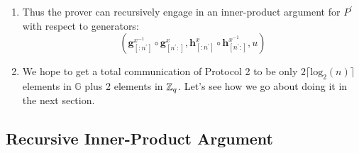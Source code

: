 \begin{enumerate}
    \item Thus the prover can recursively engage in an inner-product argument for $P^{\prime}$ with respect to generators:
    \begin{equation*}
        (\textbf{g}^{x^{-1}}_{[:n^{\prime}]} \circ \textbf{g}^x_{[n^{\prime}:]}, \textbf{h}^x_{[:n^{\prime}]} \circ \textbf{h}^{x^{-1}}_{[n^{\prime}:]},u)
    \end{equation*}

    \item We hope to get a total communication of Protocol 2 to be only $2\lceil \text{log}_2 (n) \rceil$ elements in $\mathbb{G}$ plus 2 elements in $\mathbb{Z}_q$. Let's see how we go about doing it in the next section.
    
\end{enumerate}

\newpage
\subsection{Recursive Inner-Product Argument}
\label{subsec:iipa/recursion}

